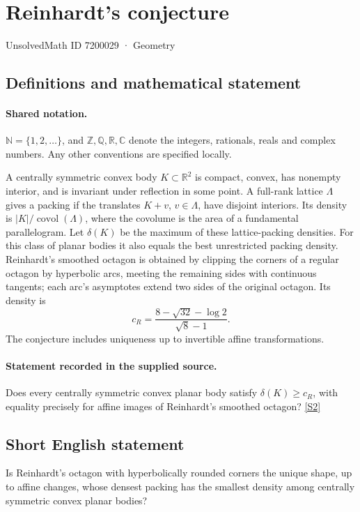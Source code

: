 \documentclass[11pt]{article}
\newcommand{\sref}[2]{\hyperlink{source:#1:#2}{[S#2]}}
\begin{document}
\setcounter{section}{7200028}
\section{Reinhardt's conjecture}\label{7200029}
{\small\sffamily UnsolvedMath ID 7200029 · Geometry}
\subsection{Definitions and mathematical statement}

\paragraph{Shared notation.}$\mathbb N=\{1,2,\ldots\}$, and $\mathbb Z,\mathbb Q,\mathbb R,\mathbb C$ denote the integers, rationals, reals and complex numbers. Any other conventions are specified locally.


A centrally symmetric convex body $K\subset\mathbb R^2$ is compact, convex, has nonempty interior, and is invariant under reflection in some point. A full-rank lattice $\Lambda$ gives a packing if the translates $K+v$, $v\in\Lambda$, have disjoint interiors. Its density is $|K|/\operatorname{covol}(\Lambda)$, where the covolume is the area of a fundamental parallelogram. Let $\delta(K)$ be the maximum of these lattice-packing densities. For this class of planar bodies it also equals the best unrestricted packing density. Reinhardt's smoothed octagon is obtained by clipping the corners of a regular octagon by hyperbolic arcs, meeting the remaining sides with continuous tangents; each arc's asymptotes extend two sides of the original octagon. Its density is
\[c_R=\frac{8-\sqrt{32}-\log 2}{\sqrt8-1}.\]
The conjecture includes uniqueness up to invertible affine transformations.
\paragraph{Statement recorded in the supplied source.}
Does every centrally symmetric convex planar body satisfy $\delta(K)\geq c_R$, with equality precisely for affine images of Reinhardt's smoothed octagon? \sref{7200029}{2}
\subsection{Short English statement}
Is Reinhardt’s octagon with hyperbolically rounded corners the unique shape, up to affine changes, whose densest packing has the smallest density among centrally symmetric convex planar bodies?
\end{document}
